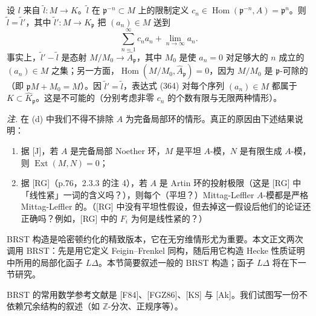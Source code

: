 设 $l$ 来自 $\tilde l:M\to K$。$\tilde l$ 在 $\mathfrak{p}^{-n}\subset M$ 上的限制定义 $c_n\in\operatorname{Hom}(\mathfrak{p}^{-n},A)=\mathfrak{p}^n$。则 $\tilde l=\tilde l'$，其中 $\tilde l':M\to K_{\mathfrak{p}}$ 把 $(a_n)\in M$ 送到
\begin{equation}\tag{364}
\sum_{n=1}^{\infty}c_na_n+\lim_{n\to\infty}a_n.
\end{equation}
事实上，$\tilde l'-\tilde l$ 是态射 $M/M_0\to\widehat A_{\mathfrak{p}}$，其中 $M_0$ 是使 $a_n=0$ 对足够大的 $n$ 成立的 $(a_n)\in M$ 之集；另一方面，$\operatorname{Hom}(M/M_0,\widehat A_{\mathfrak{p}})=0$，因为 $M/M_0$ 是 $\mathfrak{p}$-可除的（即 $\mathfrak{p}M+M_0=M$）。因 $\tilde l'=\tilde l$，表达式 (364) 对每个序列 $(a_n)\in M$ 都属于 $K\subset\widehat K_{\mathfrak{p}}$。这是不可能的（分别考虑非零 $c_n$ 的个数有限与无限两种情形）。



\emph{注.} 在 (d) 中我们不得不排除 $A$ 为完备局部环的情形。真正的原因由下述结果说明：
\begin{enumerate}[label=\arabic*),leftmargin=2.6em]
\item 据 [J]，若 $A$ 是完备局部 Noether 环，$M$ 是平坦 $A$-模，$N$ 是有限生成 $A$-模，则 $\operatorname{Ext}(M,N)=0$；
\item 据 [RG]（p.76，2.3.3 的注 4），若 $A$ 是 Artin 环的投射极限（这是 [RG] 中「线性紧」一词的含义吗？），则每个（平坦？）Mittag-Leffler $A$-模都是严格 Mittag-Leffler 的。（[RG] 中没有平坦性假设，但去掉这一假设后他们的论证还正确吗？例如，[RG] 中的 $F_i$ 为何是线性紧的？）
\end{enumerate}


BRST 构造是哈密顿约化的精致版本，它在无穷维情形尤为重要。本文正文两次调用 BRST：先是用它定义 Feigin--Frenkel 同构，随后用它构造 Hecke 性质证明中所用的局部化函子 $L\Delta$。本节简要叙述一般的 BRST 构造；函子 $L\Delta$ 将在下一节研究。

BRST 的常用数学参考文献是 [F84]、[FGZ86]、[KS] 与 [Ak]。我们试图写一份不依赖冗余结构的叙述（如 $\mathbb{Z}$-分次、正规序等）。

